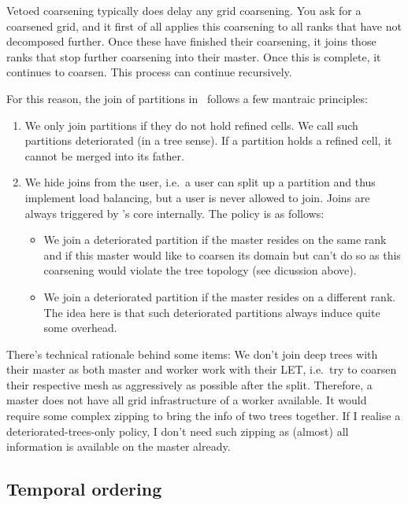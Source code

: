 \noindent
Vetoed coarsening typically does delay any grid coarsening.
You ask for a coarsened grid, and it first of all applies this coarsening to all
ranks that have not decomposed further.
Once these have finished their coarsening, it joins those ranks that stop
further coarsening into their master.
Once this is complete, it continues to coarsen.
This process can continue recursively.


For this reason, the join of partitions in \Peano\ follows a few mantraic principles:

\begin{enumerate}
  \item We only join partitions if they do not hold refined cells. We call such
  partitions deteriorated (in a tree sense). If a partition holds a refined cell,
  it cannot be merged into its father.
  \item We hide joins from the user, i.e.~a user can split up a partition and
  thus implement load balancing, but a user is never allowed to join. Joins are
  always triggered by \Peano's core internally. The policy is as follows:
  \begin{itemize}
    \item We join a deteriorated partition if the master resides on the same rank
    and if this master would like to coarsen its domain but can't do so as this
    coarsening would violate the tree topology (see dicussion above).
    \item We join a deteriorated partition if the master resides on a different
    rank. The idea here is that such deteriorated partitions always induce quite
    some overhead.
  \end{itemize}
\end{enumerate}


\noindent
There's technical rationale behind some items:
We don't join deep trees with their master as both master and worker work with
their LET, i.e.~try to coarsen their respective mesh as aggressively as possible
after the split.
Therefore, a master does not have all grid infrastructure of a worker available.
It would require some complex zipping to bring the info of two trees together.
If I realise a deteriorated-trees-only policy, I don't need such zipping as
(almost) all information is available on the master already.


\subsection{Temporal ordering}


